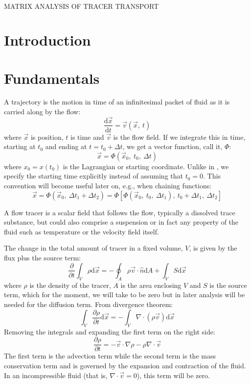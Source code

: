 \documentclass[11pt]{article}
\begin{document}
{\Large MATRIX ANALYSIS OF TRACER TRANSPORT}

\tableofcontents

\section{Introduction}

\section{Fundamentals}

A trajectory is the motion in time of an infinitesimal packet of fluid
as it is carried along by the flow:
\begin{equation}
\frac{\mathrm d \vec x}{\mathrm d t}=\vec v(\vec x,~t)
\end{equation}
where $\vec x$ is position, $t$ is time and $\vec v$ is the flow field.
If we integrate this in time, starting at $t_0$ and ending at $t=t_0+\Delta t$, we get a
vector function, call it, $\Phi$:
\begin{equation}
\vec x=\Phi(\vec x_0,~t_0,~\Delta t)
\label{traj_def}
\end{equation}
where $x_0=x(t_0)$ is the Lagrangian or starting coordinate.
Unlike in \citet{Ottino1989}, we specify the starting time explicitly instead 
of assuming that $t_0=0$.  This convention will become useful later on, e.g., 
when chaining functions:
\begin{equation}
\vec x=\Phi(\vec x_0,~\Delta t_1+\Delta t_2)=\Phi[\Phi(\vec x_0,~t_0,~\Delta t_1),~t_0 + \Delta t_1,~\Delta t_2]
\end{equation}

A flow tracer is a scalar field that follows the flow, typically a dissolved
trace substance, but could also comprise a suspension or in fact any property
of the fluid such as temperature or the velocity field itself.

The change in the total amount of tracer in a fixed volume, $V$, is given
by the flux plus the source term:
\begin{equation}
\frac{\partial}{\partial t}\int_V \rho \mathrm d \vec x=-\oint_A \rho \vec v \cdot \hat n \mathrm d A
	+ \int_V S \mathrm d \vec x
\end{equation}
where $\rho$ is the density of the tracer,
$A$ is the area enclosing $V$ and $S$ is the source term, which for the moment,
we will take to be zero but in later analysis will 
be needed for the diffusion term.
From divergence theorem:
\begin{equation}
\int_V \frac{\partial \rho}{\partial t} \mathrm d \vec x=-\int_V \nabla \cdot (\rho \vec v)\mathrm d \vec x 
\end{equation}
Removing the integrals and expanding the first term on the right side:
\begin{equation}
\frac{\partial \rho}{\partial t} =-\vec v \cdot \nabla \rho - \rho \nabla \cdot \vec v 
\label{mass_conservation_Eulerian}
\end{equation}
The first term is the advection term while the second term is the mass
conservation term and is governed by the 
expansion and contraction of the fluid.  In an incompressible fluid (that is,
$\nabla \cdot \vec v = 0$), this term will be zero.
\end{document}
